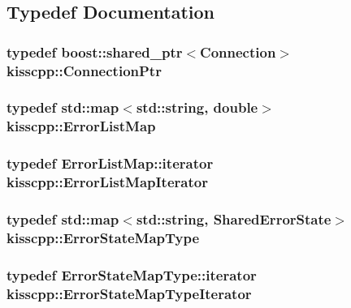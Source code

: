 \subsection{Typedef Documentation}
\hypertarget{namespacekisscpp_a4632e92aebdc8fa1c220da260469cbb2}{
\subsubsection[{Connection\-Ptr}]{\setlength{\rightskip}{0pt plus 5cm}typedef boost\-::shared\-\_\-ptr$<${\bf Connection}$>$ {\bf kisscpp\-::\-Connection\-Ptr}}}\label{namespacekisscpp_a4632e92aebdc8fa1c220da260469cbb2}
\hypertarget{namespacekisscpp_a325b559f17774bf1155d5dda8fe335e3}{
\subsubsection[{Error\-List\-Map}]{\setlength{\rightskip}{0pt plus 5cm}typedef std\-::map$<$std\-::string, double$>$ {\bf kisscpp\-::\-Error\-List\-Map}}}\label{namespacekisscpp_a325b559f17774bf1155d5dda8fe335e3}
\hypertarget{namespacekisscpp_a5493eddaf40e71c5f85672b1ab37afcb}{
\subsubsection[{Error\-List\-Map\-Iterator}]{\setlength{\rightskip}{0pt plus 5cm}typedef Error\-List\-Map\-::iterator {\bf kisscpp\-::\-Error\-List\-Map\-Iterator}}}\label{namespacekisscpp_a5493eddaf40e71c5f85672b1ab37afcb}
\hypertarget{namespacekisscpp_ab99725cc511536c050d9cab582313d0c}{
\subsubsection[{Error\-State\-Map\-Type}]{\setlength{\rightskip}{0pt plus 5cm}typedef std\-::map$<$std\-::string, {\bf Shared\-Error\-State}$>$ {\bf kisscpp\-::\-Error\-State\-Map\-Type}}}\label{namespacekisscpp_ab99725cc511536c050d9cab582313d0c}
\hypertarget{namespacekisscpp_a37b3f68e4626dc05d9d2381803a889b4}{
\subsubsection[{Error\-State\-Map\-Type\-Iterator}]{\setlength{\rightskip}{0pt plus 5cm}typedef Error\-State\-Map\-Type\-::iterator {\bf kisscpp\-::\-Error\-State\-Map\-Type\-Iterator}}}\label{namespacekisscpp_a37b3f68e4626dc05d9d2381803a889b4}
